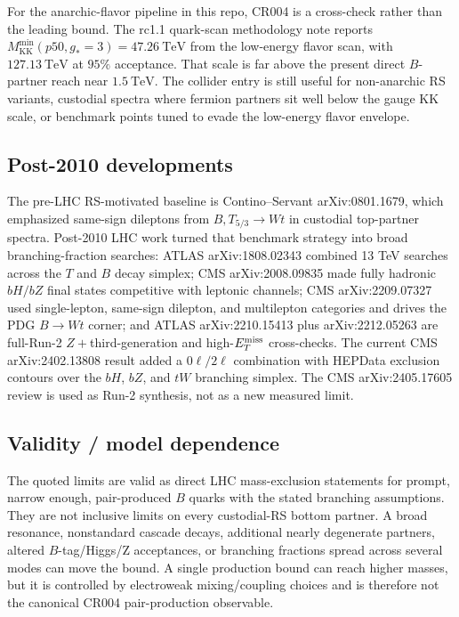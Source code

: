For the anarchic-flavor pipeline in this repo, CR004 is a cross-check rather
than the leading bound.  The rc1.1 quark-scan methodology note reports
\(M_{\mathrm{KK}}^{\min}(p50,g_\ast=3)=47.26~\mathrm{TeV}\) from the
low-energy flavor scan, with \(127.13~\mathrm{TeV}\) at \(95\%\) acceptance.
That scale is far above the present direct \(B\)-partner reach near
\(1.5~\mathrm{TeV}\).  The collider entry is still useful for non-anarchic
RS variants, custodial spectra where fermion partners sit well below the
gauge KK scale, or benchmark points tuned to evade the low-energy flavor
envelope.

\subsection*{Post-2010 developments}
The pre-LHC RS-motivated baseline is Contino--Servant arXiv:0801.1679, which
emphasized same-sign dileptons from \(B,T_{5/3}\to Wt\) in custodial
top-partner spectra.  Post-2010 LHC work turned that benchmark strategy into
broad branching-fraction searches: ATLAS arXiv:1808.02343 combined 13 TeV
searches across the \(T\) and \(B\) decay simplex; CMS arXiv:2008.09835 made
fully hadronic \(bH/bZ\) final states competitive with leptonic channels;
CMS arXiv:2209.07327 used single-lepton, same-sign dilepton, and multilepton
categories and drives the PDG \(B\to Wt\) corner; and ATLAS arXiv:2210.15413
plus arXiv:2212.05263 are full-Run-2 \(Z+\)third-generation and
high-\(E_T^{\rm miss}\) cross-checks.  The current CMS arXiv:2402.13808
result added a \(0\ell/2\ell\) combination with HEPData exclusion contours
over the \(bH\), \(bZ\), and \(tW\) branching simplex.  The CMS
arXiv:2405.17605 review is used as Run-2 synthesis, not as a new measured
limit.

\subsection*{Validity / model dependence}
The quoted limits are valid as direct LHC mass-exclusion statements for
prompt, narrow enough, pair-produced \(B\) quarks with the stated branching
assumptions.  They are not inclusive limits on every custodial-RS bottom
partner.  A broad resonance, nonstandard cascade decays, additional nearly
degenerate partners, altered \(B\)-tag/Higgs/Z acceptances, or branching
fractions spread across several modes can move the bound.  A single
production bound can reach higher masses, but it is controlled by
electroweak mixing/coupling choices and is therefore not the canonical CR004
pair-production observable.

